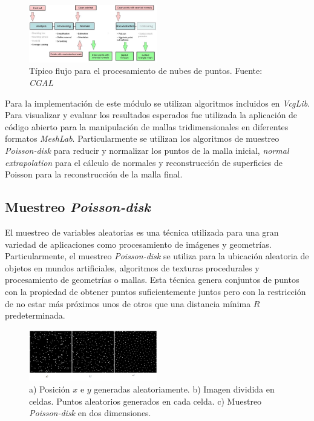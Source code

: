 \begin{figure}[H]
  \centering
    \includegraphics[width=0.5\textwidth]{./Cap6_reconstruccion/malla-flow.png}
  \caption{Típico flujo para el procesamiento de nubes de puntos. Fuente: \emph{CGAL}}
  \label{fig:Mesh-CGAL}
\end{figure}

Para la implementación de este módulo se utilizan algoritmos incluidos en \emph{VcgLib}. Para visualizar y evaluar los resultados esperados fue utilizada la aplicación de código abierto para la manipulación de mallas tridimensionales en diferentes formatos \emph{MeshLab}\cite{MeshLab}. Particularmente se utilizan los algoritmos de muestreo \emph{Poisson-disk} para reducir y normalizar los puntos de la malla inicial, \emph{normal extrapolation} para el cálculo de normales y reconstrucción de superficies de Poisson para la reconstrucción de la malla final.

\subsection{Muestreo \emph{Poisson-disk}}

El muestreo de variables aleatorias es una técnica utilizada para una gran variedad de aplicaciones como procesamiento de imágenes y geometrías. Particularmente, el muestreo \emph{Poisson-disk} se utiliza para la ubicación aleatoria de objetos en mundos artificiales, algoritmos de texturas procedurales y procesamiento de geometrías o mallas.%
Esta técnica genera conjuntos de puntos con la propiedad de obtener puntos suficientemente juntos pero con la restricción de no estar más próximos unos de otros que una distancia mínima $R$ predeterminada.

\begin{figure}[H]
  \centering
    \includegraphics[width=0.5\textwidth]{./Cap6_reconstruccion/malla-poisson.png}
  \caption{a) Posición $x$ e $y$ generadas aleatoriamente. b) Imagen dividida en celdas. Puntos aleatorios generados en cada celda. c) Muestreo \emph{Poisson-disk} en dos dimensiones.}
  \label{fig:Mesh-Poisson}
\end{figure}

